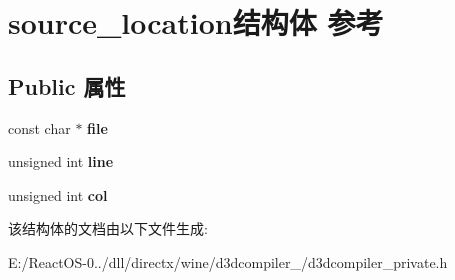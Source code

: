 \hypertarget{structsource__location}{}\section{source\+\_\+location结构体 参考}
\label{structsource__location}
\subsection*{Public 属性}
\begin{DoxyCompactItemize}
\item 
\mbox{\label{structsource__location_a9f42d68ce1f6cb09213ab5cd3c6f4af6}} 
const char $\ast$ {\bfseries file}
\item 
\mbox{\label{structsource__location_ac55d5bcac225c84ebe94120423339619}} 
unsigned int {\bfseries line}
\item 
\mbox{\label{structsource__location_a741715496bbe4eec585cb47c35e508ad}} 
unsigned int {\bfseries col}
\end{DoxyCompactItemize}


该结构体的文档由以下文件生成\+:\begin{DoxyCompactItemize}
\item 
E\+:/\+React\+O\+S-\/0../dll/directx/wine/d3dcompiler\+\_/d3dcompiler\+\_\+private.\+h\end{DoxyCompactItemize}
